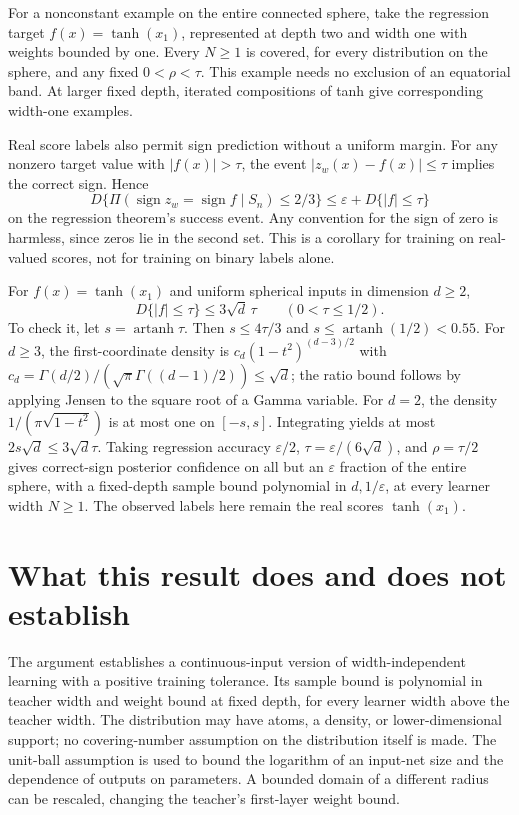 \documentclass[11pt]{article}
\theoremstyle{remark}\newtheorem{remark}[theorem]{Remark}
\begin{document}
For a nonconstant example on the entire connected sphere,
take the regression target $f(x)=\tanh(x_1)$, represented at depth two
and width one with weights bounded by one. Every $N\geq1$ is covered,
for every distribution on the sphere, and any fixed $0<\rho<\tau$.
This example needs no exclusion of an equatorial band. At larger fixed
depth, iterated compositions of tanh give corresponding width-one examples.

Real score labels also permit sign prediction without a uniform margin.
For any nonzero target value with $|f(x)|>\tau$, the event
$|z_w(x)-f(x)|\leq\tau$ implies the correct sign. Hence
\begin{equation}\label{eq:score-sign}
 D\{\Pi(\operatorname{sign}z_w=\operatorname{sign}f\mid S_n)\leq2/3\}
 \leq\varepsilon+D\{|f|\leq\tau\}
\end{equation}
on the regression theorem's success event. Any convention for the sign
of zero is harmless, since zeros lie in the second set. This is a
corollary for training on real-valued scores, not for training on binary
labels alone.

For $f(x)=\tanh(x_1)$ and uniform spherical inputs in dimension $d\geq2$,
\begin{equation}\label{eq:sphere}
 D\{|f|\leq\tau\}\leq3\sqrt d\,\tau\qquad(0<\tau\leq1/2).
\end{equation}
To check it, let $s=\operatorname{artanh}\tau$. Then
$s\leq4\tau/3$ and $s\leq\operatorname{artanh}(1/2)<0.55$.
For $d\geq3$, the first-coordinate density is
$c_d(1-t^2)^{(d-3)/2}$ with
$c_d=\Gamma(d/2)/(\sqrt\pi\Gamma((d-1)/2))\leq\sqrt d$;
the ratio bound follows by applying Jensen to the square root of a
Gamma variable. For $d=2$, the density
$1/(\pi\sqrt{1-t^2})$ is at most one on $[-s,s]$.
Integrating yields at most $2s\sqrt d\leq3\sqrt d\tau$.
Taking regression accuracy $\varepsilon/2$,
$\tau=\varepsilon/(6\sqrt d)$, and $\rho=\tau/2$ gives correct-sign
posterior confidence on all but an $\varepsilon$ fraction of the entire
sphere, with a fixed-depth sample bound polynomial in $d,1/\varepsilon$,
at every learner width $N\geq1$. The observed labels here remain the
real scores $\tanh(x_1)$.

\section{What this result does and does not establish}
The argument establishes a continuous-input version of width-independent
learning with a positive training tolerance. Its sample bound is polynomial
in teacher width and weight bound at fixed depth, for every learner width
above the teacher width. The distribution may have atoms, a density, or
lower-dimensional support; no covering-number assumption on the distribution
itself is made. The unit-ball assumption is used to bound the logarithm of
an input-net size and the dependence of outputs on parameters. A bounded
domain of a different radius can be rescaled, changing the teacher's
first-layer weight bound.
\end{document}
